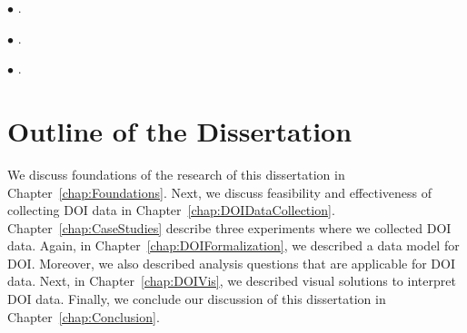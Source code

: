 $\bullet$ .    

$\bullet$ .

$\bullet$ .

\section{Outline of the Dissertation}
We discuss foundations of the research of this dissertation in Chapter~\ref{chap:Foundations}. Next, we discuss feasibility and effectiveness of collecting DOI data in Chapter~\ref{chap:DOIDataCollection}. Chapter~\ref{chap:CaseStudies} describe three experiments where we collected DOI data. Again, in Chapter~\ref{chap:DOIFormalization}, we described a data model for DOI. Moreover, we also described analysis questions that are applicable for DOI data. Next, in Chapter~\ref{chap:DOIVis}, we described visual solutions to interpret DOI data. Finally, we conclude our discussion of this dissertation in Chapter~\ref{chap:Conclusion}.

